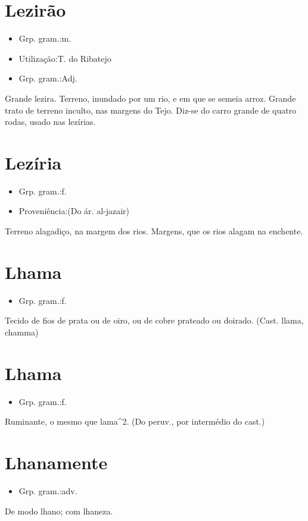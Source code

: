\section{Lezirão}
\begin{itemize}
\item {Grp. gram.:m.}
\end{itemize}
\begin{itemize}
\item {Utilização:T. do Ribatejo}
\end{itemize}
\begin{itemize}
\item {Grp. gram.:Adj.}
\end{itemize}
Grande lezira.
Terreno, inundado por um rio, e em que se semeia arroz.
Grande trato de terreno inculto, nas margens do Tejo.
Diz-se do carro grande de quatro rodas, usado nas lezírias.
\section{Lezíria}
\begin{itemize}
\item {Grp. gram.:f.}
\end{itemize}
\begin{itemize}
\item {Proveniência:(Do ár. \textunderscore al-jazair\textunderscore )}
\end{itemize}
Terreno alagadiço, na margem dos rios.
Margens, que os rios alagam na enchente.
\section{Lhama}
\begin{itemize}
\item {Grp. gram.:f.}
\end{itemize}
Tecido de fios de prata ou de oiro, ou de cobre prateado ou doirado.
(Cast. \textunderscore llama\textunderscore , chamma)
\section{Lhama}
\begin{itemize}
\item {Grp. gram.:f.}
\end{itemize}
Ruminante, o mesmo que \textunderscore lama\textunderscore ^2.
(Do peruv., por intermédio do cast.)
\section{Lhanamente}
\begin{itemize}
\item {Grp. gram.:adv.}
\end{itemize}
De modo lhano; com lhaneza.

